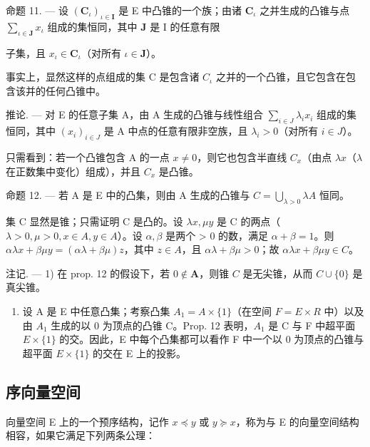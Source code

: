 命题 11. --- 设 \((\mathbf{C}_{\iota})_{\iota \in \mathbf{I}}\) 是 E 中凸锥的一个族；由诸 \(\mathbf{C}_{\iota}\) 之并生成的凸锥与点 \(\sum_{\iota \in \mathbf{J}} x_{\iota}\) 组成的集恒同，其中 \(\mathbf{J}\) 是 I 的任意有限

子集，且 \(x_{\iota} \in \mathbf{C}_{\iota}\)（对所有 \(\iota \in \mathbf{J}\)）。

事实上，显然这样的点组成的集 C 是包含诸 \(C_{\iota}\) 之并的一个凸锥，且它包含在包含该并的任何凸锥中。

推论. --- 对 E 的任意子集 A，由 A 生成的凸锥与线性组合 \(\sum_{i\in J}\lambda_{i}x_{i}\) 组成的集恒同，其中 \((x_{i})_{i\in J}\) 是 A 中点的任意有限非空族，且 \(\lambda_{i}>0\)（对所有 \(i\in J\)）。

只需看到：若一个凸锥包含 A 的一点 \(x \neq 0\)，则它也包含半直线 \(C_{x}\)（由点 \(\lambda x\)（\(\lambda\) 在正数集中变化）组成），并且 \(C_{x}\) 是凸锥。

命题 12. --- 若 A 是 E 中的凸集，则由 A 生成的凸锥与 \(C = \bigcup_{\lambda > 0} \lambda A\) 恒同。

集 C 显然是锥；只需证明 C 是凸的。设 \(\lambda x, \mu y\) 是 C 的两点（\(\lambda > 0, \mu > 0, x \in A, y \in A\)）。设 \(\alpha, \beta\) 是两个 \textgreater{} 0 的数，满足 \(\alpha + \beta = 1\)。则 \(\alpha \lambda x + \beta \mu y = (\alpha \lambda + \beta \mu) z\)，其中 \(z \in A\)，且 \(\alpha \lambda + \beta \mu > 0\)；故 \(\alpha \lambda x + \beta \mu y \in C\)。

注记. --- 1) 在 prop. 12 的假设下，若 \(0 \notin \mathbf{A}\)，则锥 \(C\) 是无尖锥，从而 \(C \cup \{0\}\) 是真尖锥。

\begin{enumerate}
\def\labelenumi{\arabic{enumi})}
\setcounter{enumi}{1}
\tightlist
\item
  设 A 是 E 中任意凸集；考察凸集 \(A_{1} = A \times \{1\}\)（在空间 \(F = E \times R\) 中）以及由 \(A_{1}\) 生成的以 0 为顶点的凸锥 C。Prop. 12 表明，\(A_{1}\) 是 C 与 F 中超平面 \(E \times \{1\}\) 的交。因此，E 中每个凸集都可以看作 F 中一个以 0 为顶点的凸锥与超平面 \(E \times \{1\}\) 的交在 E 上的投影。
\end{enumerate}

\subsection{序向量空间}

向量空间 E 上的一个预序结构，记作 \(x \preccurlyeq y\) 或 \(y \succcurlyeq x\)，称为与 E 的向量空间结构相容，如果它满足下列两条公理：

